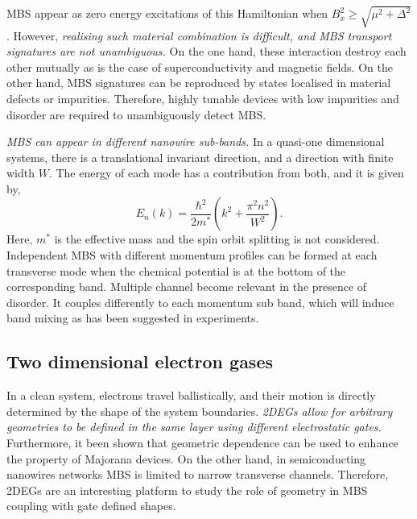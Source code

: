MBS appear as zero energy excitations of this Hamiltonian when $B_x^2 \geq \sqrt{\mu^2 + \Delta^2}$.
However, \textit{realising such material combination is difficult, and MBS transport signatures are not unambiguous.}
On the one hand, these interaction destroy each other mutually as is the case of superconductivity and magnetic fields.
On the other hand, MBS signatures can be reproduced by states localised in material defects or impurities.
Therefore, highly tunable devices with low impurities and disorder are required to unambiguously detect MBS.

\textit{MBS can appear in different nanowire sub-bands.}
In a quasi-one dimensional systems, there is a translational invariant direction, and a direction with finite width $W$.
The energy of each mode has a contribution from both, and it is given by,
\begin{equation}
E_{n}(k) = \frac{\hbar^{2}}{2m^*} \left( k^{2} + \frac{\pi^{2} n^{2}}{W^{2}} \right).
\end{equation}
Here, $m^{*}$ is the effective mass and the spin orbit splitting is not considered.
Independent MBS with different momentum profiles can be formed at each transverse mode when the chemical potential is at the bottom of the corresponding band.
Multiple channel become relevant in the presence of disorder.
It couples differently to each momentum sub band, which will induce band mixing as has been suggested in experiments.


\subsection{Two dimensional electron gases}

In a clean system, electrons travel ballistically, and their motion is directly determined by the shape of the system boundaries.
\textit{2DEGs allow for arbitrary geometries to be defined in the same layer using different electrostatic gates.}
Furthermore, it been shown that geometric dependence can be used to enhance the property of Majorana devices.
On the other hand, in semiconducting nanowires networks MBS is limited to narrow transverse channels.
Therefore, 2DEGs are an interesting platform to study the role of geometry in MBS coupling with gate defined shapes.

